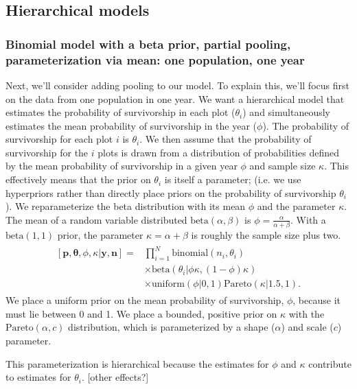\documentclass[12pt, oneside, titlepage]{article}   	%
\begin{document}
\subsection*{Hierarchical models}
\subsubsection*{Binomial model with a beta prior, partial pooling, parameterization via mean: one population, one year}

Next, we'll consider adding pooling to our model. To explain this, we'll focus first on the data from one population in one year. We want a hierarchical model that estimates the probability of survivorship in each plot ($\theta_{i}$) and simultaneously estimates the mean probability of survivorship in the year ($\phi$). The probability of survivorship for each plot $i$ is $\theta_{i}$. We then assume that the probability of survivorship for the $i$ plots is drawn from a distribution of probabilities defined by the mean probability of survivorship in a given year $\phi$ and sample size $\kappa$. This effectively means that the prior on $\theta_{i}$ is itself a parameter; (i.e. we use hyperpriors rather than directly place priors on the probability of survivorship $\theta_{i}$). We reparameterize the beta distribution with its mean $\phi$ and the parameter $\kappa$. The mean of a random variable distributed $\mathrm{beta}(\alpha,\beta)$ is $\phi = \frac{\alpha}{\alpha+\beta}$. With a $\mathrm{beta}(1,1)$ prior, the parameter $\kappa = \alpha + \beta$ is roughly the sample size plus two.
%
\begin{align}
  \begin{split}
[\bm{p},\bm{\theta},\phi,\kappa|\bm{y},\bm{n}]  = & \prod_{i=1}^N \mathrm{binomial}(n_{i},\theta_{i}) 
    \\ & \times \mathrm{beta} (  \theta_{i} | \phi \kappa , (1-\phi) \kappa )
    \\ & \times \mathrm{uniform} ( \phi | 0, 1) \mathrm{Pareto} ( \kappa | 1.5, 1 ). \label{eq:bayesianHyear}
  \end{split}
\end{align}
%
We place a uniform prior on the mean probability of survivorship, $\phi$, because it must lie between 0 and 1. We place a bounded, positive prior on $\kappa$ with the $\mathrm{Pareto}(\alpha,c)$ distribution, which is parameterized by a shape ($\alpha$) and scale ($c$) parameter. 

This parameterization is hierarchical because the estimates for $\phi$ and $\kappa$ contribute to estimates for $\theta_i$. [other effects?]
\end{document}

